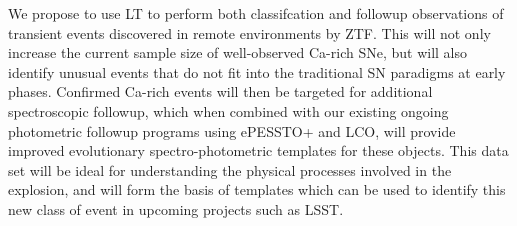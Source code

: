 \documentclass[11pt]{article}
\begin{document}
{We propose to use LT to perform both classifcation and followup observations of transient events discovered in remote environments by ZTF. This will not only increase the current sample size of well-observed Ca-rich SNe, but will also identify unusual events that do not fit into the traditional SN paradigms at early phases. Confirmed Ca-rich events will then be targeted for additional spectroscopic followup, which when combined with our existing ongoing photometric followup programs using ePESSTO+ and LCO, will provide improved evolutionary spectro-photometric templates for these objects. This data set will be ideal for understanding the physical processes involved in the explosion, and will form the basis of templates which can be used to identify this new class of event in upcoming projects such as LSST.  
}
\end{document}
